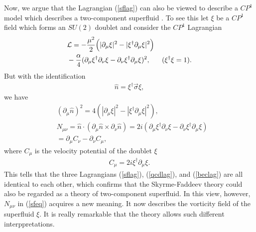 \documentclass[twocolumn,showpacs,showkeys]{revtex4}
\newcommand{\bea}{\begin{eqnarray}}
\newcommand{\eea}{\end{eqnarray}}
\newcommand{\pro}{\partial}
\newcommand{\n}{\hat n}
\newcommand{\dfrac}{\displaystyle\frac}
\newcommand{\nn}{\nonumber}
\newcommand{\hn}{\hat n}
\begin{document}
Now, we argue that the Lagrangian (\ref{sflag}) can also
be viewed to describe a $CP^1$ model which describes a two-component
superfluid \cite{cho1,cho2}.  To see this let $\xi$ be a $CP^1$ field
which forms an $SU(2)$ doublet
and consider the $CP^1$ Lagrangian
\bea
&{\cal L} = -\dfrac {\mu^2}{2} \Big(|\pro_\mu
\xi |^2 - |\xi^\dag \pro_\mu \xi|^2 \Big) \nn\\
&- \dfrac {\alpha}{4} (\pro_\mu \xi^\dag \pro_\nu \xi
- \pro_\nu \xi^\dag \pro_\mu \xi)^2,
~~~~~(\xi^\dag \xi = 1).
\label{beclag}
\eea
But with the identification
\bea
\n = \xi^\dag \vec \sigma \xi,
\label{ndef}
\eea
we have
\bea
& (\pro_\mu \hn)^2 = 4 (|\pro_\mu \xi|^2
- |\xi^\dag \pro_\mu \xi|^2), \nn\\
&N_{\mu\nu} = \hn \cdot (\pro_\mu \hn \times \pro_\nu \hn)
= 2i (\pro_\mu \xi^\dag \pro_\nu \xi
- \pro_\nu \xi^\dag \pro_\mu \xi ) \nn\\
&= \pro_\mu C_\nu - \pro_\nu C_\mu,
\label{fmn}
\eea
where $C_\mu$ is the velocity potential of the doublet
$\xi$ \cite{cho2}
\bea
C_\mu = 2i \xi^\dag \pro_\mu \xi.
\label{cm}
\eea
This tells that the three Lagrangians (\ref{sflag}), (\ref{qcdlag}),
and (\ref{beclag}) are all identical to each other, which confirms that
the Skyrme-Faddeev theory could also be regarded as a theory of
two-component superfluid. In this view, however,
$N_{\mu\nu}$ in (\ref{sfeq}) acquires a new
meaning. It now describes
the vorticity field of the superfluid $\xi$.
It is really remarkable that the theory allows
such different interppretations.
\end{document}

